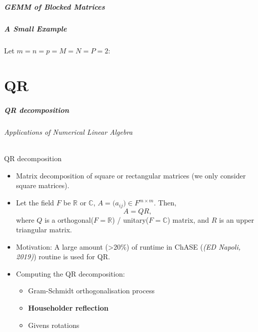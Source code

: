 \begin{frame}
\frametitle{GEMM of Blocked Matrices}
\frametitle{A Small Example}
Let \(m = n = p = M = N = P = 2\):
\vspace{0.3cm}
\begin{center}
\end{center}
\end{frame}

\part{QR}
\makepart

\begin{frame}
\frametitle{QR decomposition}
\framesubtitle{Applications of Numerical Linear Algebra}
QR decomposition
\begin{itemize}
 \item Matrix decomposition of square or rectangular matrices (we only consider square matrices).
 \item Let the field \(F\) be \(\mathbb{R}\) or \(\mathbb{C}\), \(A =\big( a_{ij} \big) \in F^{m \times m}\). Then,
 \begin{equation}
  A = QR,
 \end{equation}
 where \(Q\) is a orthogonal(\(F=\mathbb{R}\)) / unitary(\(F=\mathbb{C}\)) matrix, and \(R\) is an upper triangular matrix.
 \item Motivation: A large amount (>20\%) of runtime in ChASE (\emph{(ED Napoli, 2019)}) routine is used for QR.
 \item Computing the QR decomposition:
 \begin{itemize}
  \item Gram-Schmidt orthogonalisation process
  \item \textbf{Householder reflection}
  \item Givens rotations
 \end{itemize}
\end{itemize}
\end{frame}

